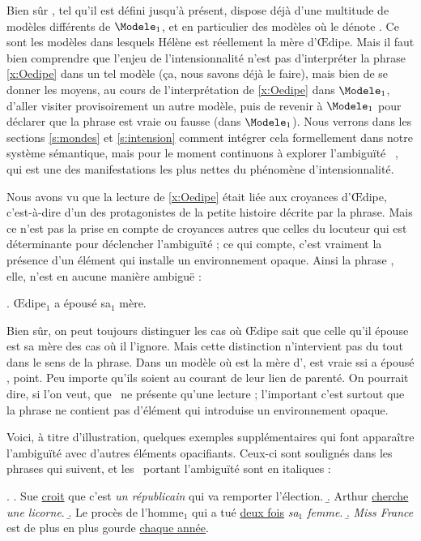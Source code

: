 Bien sûr {\LO}, tel qu'il est défini jusqu'à présent, dispose déjà d'une multitude de modèles différents de $\Modele_1$, et en particulier des modèles où le {\GN}  dénote . Ce sont les modèles dans lesquels {Hélène} est réellement la mère d'\OE dipe.  Mais il faut bien comprendre que 
l'enjeu de l'intensionnalité n'est pas d'interpréter la phrase \ref{x:Oedipe} dans un tel modèle (ça, nous savons déjà le faire), mais bien de se donner les moyens, au cours de l'interprétation de \ref{x:Oedipe} dans $\Modele_1$, d'aller visiter provisoirement un autre modèle, puis de revenir à $\Modele_1$ pour déclarer que la phrase est vraie ou fausse (dans $\Modele_1$). Nous verrons dans les sections \ref{s:mondes} et \ref{s:intension} comment intégrer cela formellement dans notre système sémantique, mais pour le moment continuons à explorer l'ambiguïté  {\vs}\ , qui est une des manifestations les plus nettes du phénomène d'intensionnalité.


Nous avons vu que la lecture  de \ref{x:Oedipe} était liée aux croyances d'\OE dipe, c'est-à-dire d'un des protagonistes de la petite histoire décrite par la phrase. Mais ce n'est pas la prise en compte de croyances autres que celles du locuteur qui est déterminante pour déclencher l'ambiguïté ; ce qui compte, c'est vraiment la présence d'un élément qui installe un environnement opaque.  Ainsi la phrase {\Next}, elle, n'est en aucune manière ambiguë :


\ex. \OE dipe$_1$ a épousé sa$_1$ mère.

Bien sûr, on peut toujours distinguer les cas où \OE dipe {sait} que celle qu'il épouse est sa mère des cas où il l'ignore. Mais cette distinction n'intervient pas du tout dans le sens de la phrase.  Dans un modèle où  est la mère d', {\Last} est vraie ssi  a épousé , point. Peu importe qu'ils soient au courant de leur lien de parenté.
On pourrait dire, si l'on veut, que \Last\ ne présente qu'une lecture {\dere} ; l'important c'est surtout que la phrase ne contient pas d'élément qui introduise un environnement opaque.  

Voici, à titre d'illustration, quelques exemples supplémentaires qui font apparaître l'ambiguïté avec d'autres éléments opacifiants.  Ceux-ci sont soulignés  dans les phrases qui suivent, et les \GN\ portant l'ambiguïté sont en italiques :


\ex. 
\a.
Sue \uline{croit} que c'est \emph{un républicain} qui va remporter l'élection.
\label{x:SueRep}
\b. Arthur \uline{cherche} \emph{une licorne}.
\label{x:ArtLic}
\b. Le procès de l'homme$_1$ qui a tué \uline{deux fois} \emph{sa$_1$
  femme}. 
\label{x:Libe}
\b. \emph{Miss France} est de plus en plus gourde \uline{chaque année}.
\label{x:MissF}


